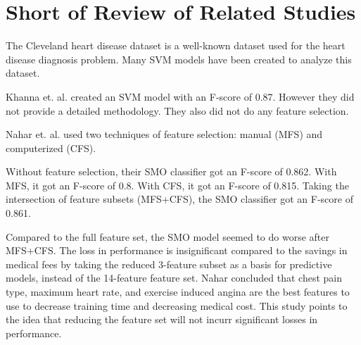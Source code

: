 \documentclass[conference]{IEEEtran}
\begin{document}
\section{Short of Review of Related Studies}
	The Cleveland heart disease dataset is a well-known dataset used for the heart disease diagnosis problem.
	Many SVM models have been created to analyze this dataset.

	Khanna et. al. \cite{bib:mltech} created an SVM model with an F-score of 0.87.
	However they did not provide a detailed methodology.
	They also did not do any feature selection.

	Nahar et. al. \cite{bib:smo} used two techniques of feature selection: 
	manual (MFS) and computerized (CFS).

	Without feature selection, their SMO classifier got an F-score of 0.862.
	With MFS, it got an F-score of 0.8.
	With CFS, it got an F-score of 0.815.
	Taking the intersection of feature subsets (MFS+CFS), the SMO classifier got an F-score of 0.861.

	Compared to the full feature set, the SMO model seemed to do worse after MFS+CFS.
	The loss in performance is insignificant compared to the savings in medical fees by taking the reduced 3-feature subset as a basis for predictive models, instead of the 14-feature feature set.
	Nahar concluded that chest pain type, maximum heart rate, and exercise induced angina are the best features to use to decrease training time and decreasing medical cost.
	This study points to the idea that reducing the feature set will not incurr significant losses in performance.
\end{document}
